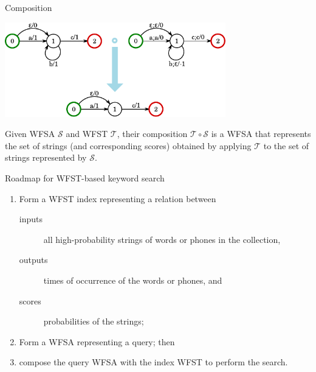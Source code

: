 \begin{frame}{Composition}{}
  \begin{center}
    \includegraphics[width=96mm]{figures/Composition}
  \end{center}
  \vfill
  Given WFSA $\mathcal{S}$ and WFST $\mathcal{T}$, their composition
  $\mathcal{T} \circ \mathcal{S}$ is a WFSA that represents the set of
  strings (and corresponding scores) obtained by applying
  $\mathcal{T}$ to the set of strings represented by $\mathcal{S}$.
\end{frame}

\begin{frame}{Roadmap for WFST-based keyword search}{}
  \begin{enumerate}
  \item Form a WFST index representing a relation between
    \begin{description}
      \item[inputs] all high-probability strings of words or phones in
        the collection,
      \item[outputs] times of occurrence of the words or phones, and
      \item[scores] probabilities of the strings;
    \end{description}
    \item Form a WFSA representing a query; then
    \item \alert{compose} the query WFSA with the index WFST to
      perform the search.
  \end{enumerate}
\end{frame}

